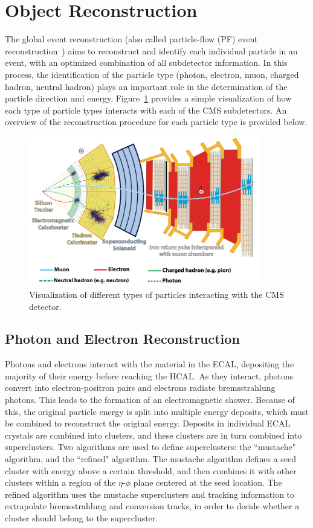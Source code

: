 \section{Object Reconstruction}
The global event reconstruction (also called particle-flow (PF) event reconstruction~\cite{CMS:2017yfk}) aims to reconstruct and identify each individual particle in an event, with an optimized combination of all subdetector information. In this process, the identification of the particle type (photon, electron, muon, charged hadron, neutral hadron) plays an important role in the determination of the particle direction and energy. Figure~\ref{fig:particles_interact} provides a simple visualization of how each type of particle types interacts with each of the CMS subdetectors. An overview of the reconstruction procedure for each particle type is provided below.

\begin{figure}[tb]
  \centering
   \includegraphics[width=0.9\textwidth]{fig/experiment/reconstruction/cms_detector.png}
	\caption{Visualization of different types of particles interacting with the CMS detector.}
	\label{fig:particles_interact}
\end{figure}

\subsection{Photon and Electron Reconstruction}
Photons and electrons interact with the material in the ECAL, depositing the majority of their energy before reaching the HCAL. As they interact, photons convert into 
electron-positron pairs and electrons radiate bremsstrahlung photons. This leads to the formation of an electromagnetic shower. Because of this, the original particle energy 
is split into multiple energy deposits, which must be combined to reconstruct the original energy. Deposits in individual ECAL crystals are combined into clusters, 
and these clusters are in turn combined into superclusters. Two algorithms are used to define superclusters: the ``mustache" algorithm, and the ``refined" algorithm.
The mustache algorithm defines a seed cluster with energy above a certain threshold, and then combines it with other clusters within a region of the $\eta$-$\phi$ plane centered at the 
seed location. The refined algorithm uses the mustache superclusters and tracking information to extrapolate bremsstrahlung and conversion tracks, in order to decide whether a cluster should belong 
to the supercluster. 

